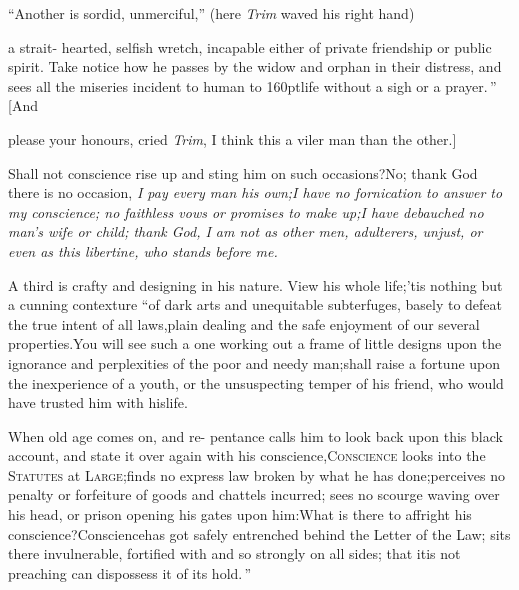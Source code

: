 \documentclass{article}
\begin{document}
“Another is sordid, unmerciful,” (here
\textit{Trim} waved his right hand)
\begin{story}{a strait-}
    hearted, selfish wretch, incapable either of private
    friendship or public spirit. Take notice how he
    passes by the wi\-dow and orphan in their distress,
    and sees all the miseries incident to human\break
    \hbox to 160pt{life without a sigh or a prayer.\,” [And}
\end{story}
\newpage\noindent
please your honours, cried
\textit{Trim}, I think this a viler man than the other.]

\begin{story}{Shall not conscience rise up and sting}
    him on such occasions?\tsh No; thank God there is no
    occasion, \textit{I pay every man his own;\tsk I
    have no fornication to answer to my conscience;\tsk
    no faithless vows or promises to make up;\tsk I have
    debauched no man’s wife or child; thank God, I am
    not as other men, adulterers, unjust, or even as
    this libertine, who stands before me.}
\end{story}
\vspace\parskip

\begin{story}{A third is crafty and designing in}
    his nature. View
his whole life;\tsk ’tis nothing but a cunning
contexture “of dark arts and unequitable
subterfuges, basely to defeat the true intent of all
laws,\tsh plain dealing and the safe enjoyment of our
several properties.\tsh\pb You will see such a one working
out a frame of little designs upon the ignorance and perplexities
of the poor and needy man;\tsk shall raise a fortune upon the
inexperience of a youth, or the unsuspecting temper of his friend,
who would have trusted him with his\break life.
\end{story}
\vspace\parskip

\begin{story}{When old age comes on, and re-}
    pentance calls him to look back upon this black
    account, and state it over\break
    again with his conscience,\tsh \textsc{Con\-science} looks into the
    \textsc{Statutes} at\break
    \textsc{Large};\tsk finds no express law
    broken by what he has done;\tsk perceives no penalty
    or forfeiture of goods and chat\-tels incurred;\tsk
    sees no scourge waving 
    over his head, or prison opening his\break
    gates upon him:\tsk What is there to\break
    affright his conscience?\tsk Conscience\pb has got
    safely entrenched behind the Letter of the Law; sits
    there invulnerable, fortified with 
    and \break so strongly on all sides;\tsk
that it\break is not preaching can dispossess it of its hold.\,”
\end{story} \vspace\parskip
\end{document}
